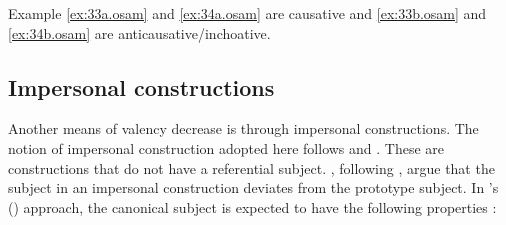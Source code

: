 \documentclass[output=paper]{langsci/langscibook}
\begin{document}
Example \ref{ex:33a.osam} and \ref{ex:34a.osam} are causative and \ref{ex:33b.osam} and \ref{ex:34b.osam} are anticausative/inchoative.

\ea
\label{ex:33.osam}
	\z

	\z
\z


\ea
\label{ex:34.osam}
	\z

	\z
\z


\subsection{Impersonal constructions}\label{§4.4:impersonal.osam}

Another means of valency decrease is through impersonal constructions. The notion of impersonal construction adopted here follows \citet{siewierska2008,siewierska2011} and \citet{malchukovogawa2011}. These are constructions that do not have a referential subject. \citet{malchukovogawa2011}, following \citet{keenan1976}, argue that the subject in an impersonal construction deviates from the prototype subject. In \citeauthor{keenan1976}'s (\citeyear{keenan1976}) approach, the canonical subject is expected to have the following properties \citep[23]{malchukovogawa2011}:
\end{document}
